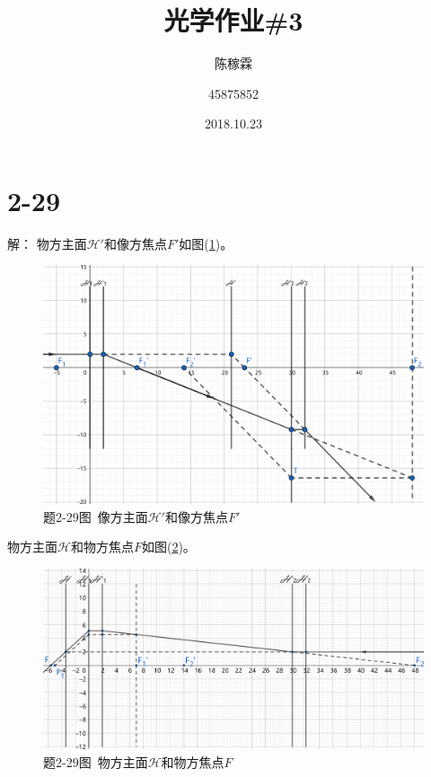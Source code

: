 \documentclass[10pt,a4paper]{article}
\title{光学作业\#3}
\author{陈稼霖 \and 45875852}
\date{2018.10.23}
\theoremstyle{remark}
\begin{document}
\maketitle
\section*{2-29}解：
物方主面$\mathscr{H'}$和像方焦点$F'$如图(\ref{OpticsHomework_3Problem_2-29_1})。
\begin{figure}[h]
\centering
\includegraphics[scale=.25]{OpticsHomework_3Problem_2-29_1(tailored&marked).png}
\caption{题2-29图~像方主面$\mathscr{H'}$和像方焦点$F'$}\label{OpticsHomework_3Problem_2-29_1}
\end{figure}

\newpage
物方主面$\mathscr{H}$和物方焦点$F$如图(\ref{OpticsHomework_3Problem_2-29_2})。
\begin{figure}[h]
\centering
\includegraphics[scale=.2]{OpticsHomework_3Problem_2-29_2(tailored&marked).png}
\caption{题2-29图~物方主面$\mathscr{H}$和物方焦点$F$}\label{OpticsHomework_3Problem_2-29_2}
\end{figure}
\end{document}
